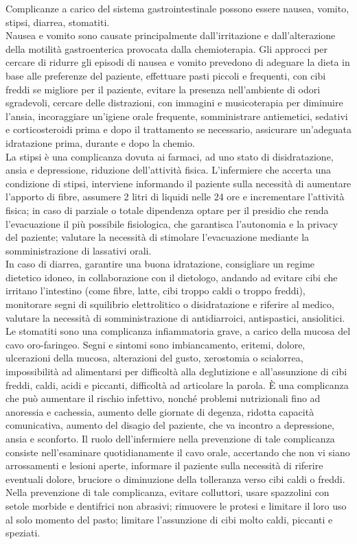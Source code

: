 Complicanze a carico del sistema gastrointestinale possono essere nausea, vomito, stipsi, diarrea, stomatiti.\\
Nausea e vomito sono causate principalmente dall’irritazione e dall’alterazione della motilità gastroenterica 
provocata dalla chemioterapia. Gli approcci per cercare di ridurre gli episodi di nausea e vomito prevedono di 
adeguare la dieta in base alle preferenze del paziente, effettuare pasti piccoli e frequenti, con cibi freddi se 
migliore per il paziente, evitare la presenza nell’ambiente di odori sgradevoli, cercare delle distrazioni, con 
immagini e musicoterapia per diminuire l’ansia, incoraggiare un’igiene orale frequente, somministrare antiemetici, 
sedativi e corticosteroidi prima e dopo il trattamento se necessario, assicurare un’adeguata idratazione prima, 
durante e dopo la chemio.\\
La stipsi è una complicanza dovuta ai farmaci, ad uno stato di disidratazione, ansia e depressione, riduzione 
dell’attività fisica. L’infermiere che accerta una condizione di stipsi, interviene informando il paziente sulla 
necessità di aumentare l’apporto di fibre, assumere 2 litri di liquidi nelle 24 ore e incrementare l’attività fisica; 
in caso di parziale o totale dipendenza optare per il presidio che renda l’evacuazione il più possibile fisiologica, 
che garantisca l’autonomia e la privacy del paziente; valutare la necessità di stimolare l’evacuazione mediante la 
somministrazione di lassativi orali.\\ 
In caso di diarrea, garantire una buona idratazione, consigliare un regime dietetico idoneo, in collaborazione con il 
dietologo, andando ad evitare cibi che irritano l’intestino (come fibre, latte, cibi troppo caldi o troppo freddi), 
monitorare segni di squilibrio elettrolitico o disidratazione e riferire al medico, valutare la necessità di 
somministrazione di antidiarroici, antispastici, ansiolitici.\\
Le stomatiti sono una complicanza infiammatoria grave, a carico della mucosa del cavo oro-faringeo. 
Segni e sintomi sono imbiancamento, eritemi, dolore, ulcerazioni della mucosa, alterazioni del gusto, xerostomia o 
scialorrea, impossibilità ad alimentarsi per difficoltà alla deglutizione e all’assunzione di cibi freddi, caldi, 
acidi e piccanti, difficoltà ad articolare la parola. È una complicanza che può aumentare il rischio infettivo, 
nonché problemi nutrizionali fino ad anoressia e cachessia, aumento delle giornate di degenza, ridotta capacità 
comunicativa, aumento del disagio del paziente, che va incontro a depressione, ansia e sconforto. 
Il ruolo dell’infermiere nella prevenzione di tale complicanza consiste nell’esaminare quotidianamente il cavo orale, 
accertando che non vi siano arrossamenti e lesioni aperte, informare il paziente sulla necessità di riferire 
eventuali dolore, bruciore o diminuzione della tolleranza verso cibi caldi o freddi. Nella prevenzione di tale 
complicanza, evitare colluttori, usare spazzolini con setole morbide e dentifrici non abrasivi; rimuovere le 
protesi e limitare il loro uso al solo momento del pasto; limitare l'assunzione di cibi molto caldi, 
piccanti e speziati.\\ %

